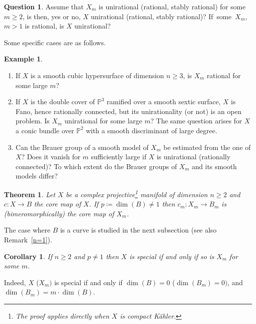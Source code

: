 \documentclass[JEP,XML,SOM,Unicode, NoEqCountersInSection,NoFloatCountersInSection,published]{cedram}
\theoremstyle{theorem}
\newtheorem{theorem}{Theorem}
\newtheorem{corollary}[proposition]{Corollary}
\theoremstyle{definition}
\newtheorem{question}{Question}
\newtheorem{example}{Example}
\def\bP{{\mathbb P}}
\begin{document}
\begin{question} Assume that $X_m$ is unirational (\resp rational, stably rational) for some $m\geq 2$, is then, yes or no, $X$ unirational (\resp rational, stably rational)? If~some~$X_m$, $m>1$ is rational, is $X$ unirational? \end{question}

Some specific cases are as follows.

\skpt
\begin{example}
\begin{enumerate}
\item
If $X$ is a smooth cubic hypersurface of dimension $n\geq 3$, is $X_m$ rational for some large $m$?

\item
If $X$ is the double cover of $\bP^3$ ramified over a smooth sextic surface, $X$ is Fano, hence rationally connected, but its unirationality (or not) is an open problem. Is $X_m$ unirational for some large $m$? The same question arises for $X$ a conic bundle over $\bP^2$ with a smooth discriminant of large degree.

\item
Can the Brauer group of a smooth model of $X_m$ be estimated from the one of $X$? Does it vanish for $m$ sufficiently large if $X$ is unirational (\resp rationally connected)? To which extent do the Brauer groups of $X_m$ and its smooth models differ?
\end{enumerate}
\end{example}


\begin{theorem}\label{c_m} Let $X$ be a complex projective\footnote{The proof applies directly when $X$ is compact Kähler.} manifold of dimension $n \geq 2$ and $c:X\to B$ the core map of $X$. If $p\coloneqq \dim(B) \neq 1$ then $c_m:X_m\to B_m$ is (bimeromorphically) the core map of $X_m$.
\end{theorem}

The case where $B$ is a curve is studied in the next subsection (see also Remark~\ref{n=1}).

\begin{corollary}\label{cor:core} If $n\geq 2$ and $p \neq 1$ then $X$ is special if and only if so is $X_m$ for some $m$.
\end{corollary}

Indeed, $X$ (\resp $X_m)$ is special if and only if $\dim(B)=0$ (\resp $\dim(B_m)=0)$, and $\dim(B_m)=m\cdot \dim(B)$.
\end{document}
